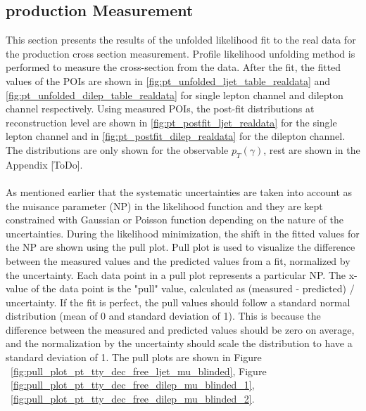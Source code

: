 \subsection{\tty production Measurement}
\label{sec:tty_prod_measurement}

This section presents the results of the unfolded likelihood fit to the real data for the \tty production cross section measurement. Profile likelihood unfolding method is performed to measure the cross-section from the data. %
After the fit, the fitted values of the POIs are shown in \cref{fig:pt_unfolded_ljet_table_realdata} and \cref{fig:pt_unfolded_dilep_table_realdata} for single lepton channel and dilepton channel respectively. Using measured POIs, the post-fit distributions at reconstruction level are shown in \cref{fig:pt_postfit_ljet_realdata} for the single lepton channel and in \cref{fig:pt_postfit_dilep_realdata} for the dilepton channel. The distributions are only shown for the observable $p_T(\gamma)$, rest are shown in the Appendix [ToDo]. \\
\\
As mentioned earlier that the systematic uncertainties are taken into account as the nuisance parameter (NP) in the likelihood function and they are kept constrained with Gaussian or Poisson function depending on the nature of the uncertainties.
During the likelihood minimization, the shift in the fitted values for the NP are shown using the pull plot. Pull plot is used to visualize the difference between the measured values and the predicted values from a fit, normalized by the uncertainty. Each data point in a pull plot represents a particular NP. The x-value of the data point is the "pull" value, calculated as (measured - predicted) / uncertainty. If the fit is perfect, the pull values should follow a standard normal distribution (mean of 0 and standard deviation of 1). This is because the difference between the measured and predicted values should be zero on average, and the normalization by the uncertainty should scale the distribution to have a standard deviation of 1. The pull plots are shown in Figure ~\ref{fig:pull_plot_pt_tty_dec_free_ljet_mu_blinded}, Figure ~\ref{fig:pull_plot_pt_tty_dec_free_dilep_mu_blinded_1}, ~\ref{fig:pull_plot_pt_tty_dec_free_dilep_mu_blinded_2}. 
\\

